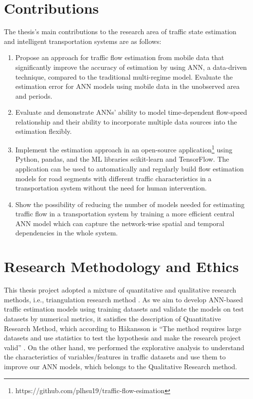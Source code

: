 \documentclass[english]{kththesis}
\begin{document}
\section{Contributions}
\label{sec:contributions}
The thesis's main contributions to the research area of traffic state estimation and intelligent transportation systems are as follows:
\begin{enumerate}
    \item Propose an approach for traffic flow estimation from mobile data that significantly improve the accuracy of estimation by using ANN, a data-driven technique, compared to the traditional multi-regime model. Evaluate the estimation error for ANN models using mobile data in the unobserved area and periods.
    \item Evaluate and demonstrate ANNs' ability to model time-dependent flow-speed relationship and their ability to incorporate multiple data sources into the estimation flexibly.
    \item Implement the estimation approach in an open-source application\footnote{https://github.com/plhsu19/traffic-flow-esimation}  using Python, pandas, and the ML libraries scikit-learn and TensorFlow.  The application can be used to automatically and regularly build flow estimation models for road segments with different traffic characteristics in a transportation system without the need for human intervention.
    \item Show the possibility of reducing the number of models needed for estimating traffic flow in a transportation system by training a more efficient central ANN model which can capture the network-wise spatial and temporal dependencies in the whole system.
\end{enumerate}


\section{Research Methodology and Ethics}
This thesis project adopted a mixture of quantitative and qualitative research methods, i.e., triangulation research method \cite{hakansson_research_method}. As we aim to develop ANN-based traffic estimation models using training datasets and validate the models on test datasets by numerical metrics, it satisfies the description of Quantitative Research Method, which according to Håkansson is “The method requires large datasets and use statistics to test the hypothesis and make the research project valid” \cite{hakansson_research_method}. On the other hand, we performed the explorative analysis to understand the characteristics of variables/features in traffic datasets and use them to improve our ANN models, which belongs to the Qualitative Research method.
\end{document}
